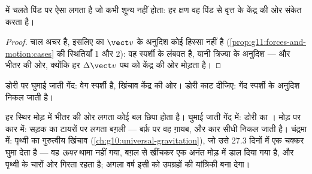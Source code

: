 \begin{proposition}[भीतर की ओर बल]\label{prop:g11:forces-and-motion:inward}
 में चलते पिंड पर ऐसा  लगता है
जो कभी शून्य नहीं होता: हर क्षण वह पिंड से वृत्त के केंद्र की ओर संकेत करता
है।
\end{proposition}

\begin{proof}
चाल अचर है, इसलिए  का $\vect v$ के अनुदिश कोई हिस्सा नहीं
है (\cref{prop:g11:forces-and-motion:cases} की स्थितियाँ 1 और 2): वह स्पर्शी के लंबवत है, यानी त्रिज्या के
अनुदिश --- और भीतर की ओर, क्योंकि हर $\Delta \vect v$ पथ को केंद्र की ओर मोड़ता है।
\end{proof}

\begin{omfigure}

{\small डोरी पर घुमाई जाती गेंद: वेग स्पर्शी है, खिंचाव केंद्र की ओर। डोरी
काट दीजिए: गेंद स्पर्शी के अनुदिश निकल जाती है।}
\end{omfigure}

\begin{example}[डोरी, मोड़ और चंद्रमा]\label{ex:g11:forces-and-motion:moon}
हर स्थिर मोड़ में भीतर की ओर लगता कोई बल छिपा होता है। घुमाई जाती
गेंद में: डोरी का । मोड़ पर कार में: सड़क का टायरों पर लगता
बग़ली  --- बर्फ़ पर वह ग़ायब, और कार सीधी निकल जाती
है। चंद्रमा में: पृथ्वी का गुरुत्वीय खिंचाव (\cref{ch:g10:universal-gravitation}), जो उसे \num{27.3} दिनों
में एक चक्कर घुमा देता है --- वह \emph{ऊपर} थामा नहीं गया, बग़ल से खींचकर
एक अनंत मोड़ में डाल दिया गया है, और पृथ्वी के चारों ओर गिरता रहता है; अगला
वर्ष इसी को उपग्रहों की यांत्रिकी बना देगा।
\end{example}


